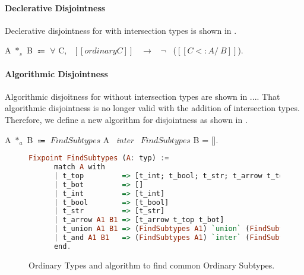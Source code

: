 \paragraph{Declerative Disjointness}
Declerative disjointness for \cal with intersection types is shown in .

\begin{definition}
\label{def:inter:disj}
  A $*_s$ B $\Coloneqq$ $\forall$ C, \ $[[ordinary C]]$ \ $\rightarrow$ \ $\neg$ \ ($[[C <: A /\ B]]$).
\end{definition}

\paragraph{Algorithmic Disjointness}
Algorithmic disjoitness for \cal without intersection types are shown in .... That algorithmic
disjointness is no longer valid with the addition of intersection types. Therefore, we define a
new algorithm for disjointness as shown in .

\begin{definition}
\label{def:inter:ad}
  A $*_a$ B $\Coloneqq$ $FindSubtypes$ A \ {\textasciigrave}\emph{inter}{\textasciigrave} \ $FindSubtypes$ B = [].
\end{definition}

\begin{figure}[t]
  \begin{small}
    \centering
  \end{small}
  \begin{lstlisting}[language=Haskell]
  Fixpoint FindSubtypes (A: typ) :=
      match A with
      | t_top         => [t_int; t_bool; t_str; t_arrow t_top t_bot; t_top]
      | t_bot         => []
      | t_int         => [t_int]
      | t_bool        => [t_bool]
      | t_str         => [t_str]
      | t_arrow A1 B1 => [t_arrow t_top t_bot]
      | t_union A1 B1 => (FindSubtypes A1) `union` (FindSubtypes B1)
      | t_and A1 B1   => (FindSubtypes A1) `inter` (FindSubtypes B1)
      end.
  \end{lstlisting}
  \caption{Ordinary Types and algorithm to find common Ordinary Subtypes.}
  \label{fig:inter:ord}
\end{figure}